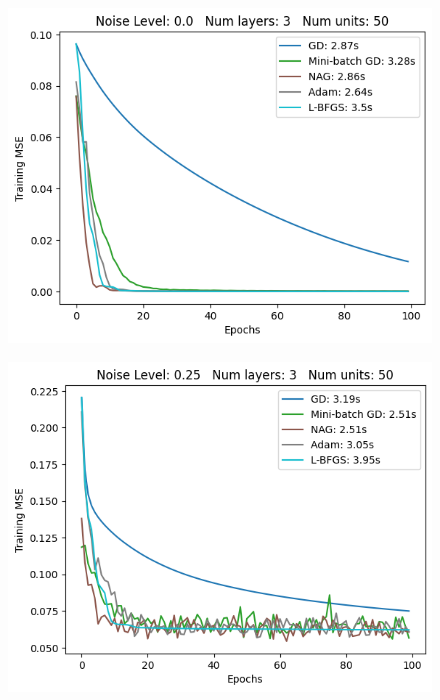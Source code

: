 \begin{figure}[h!]
    \begin{minipage}[t]{0.32\textwidth}
        \includegraphics[width=\textwidth]{figures/noise-level-0-0-num-layers-3-num-units-50.png}
        \label{fig:noise-level-0-0-num-layers-3-num-units-50}
    \end{minipage}
    \begin{minipage}[t]{0.32\textwidth}
        \includegraphics[width=\textwidth]{figures/noise-level-0-25-num-layers-3-num-units-50.png}
        \label{fig:noise-level-0-25-num-layers-3-num-units-50}
    \end{minipage}

\end{figure}
